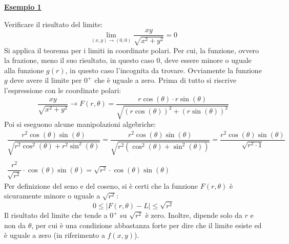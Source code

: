 \documentclass[a4paper]{article}
\newcommand{\example}[1]{\textcolor{Green4}{\textbf{#1}}}
\begin{document}
	\begin{flushleft}
		\example{\underline{Esempio 1}}
	\end{flushleft}
	Verificare il risultato del limite:
	\begin{equation*}
		\displaystyle\lim_{\left(x,y\right) \rightarrow \left(0,0\right)} \dfrac{xy}{\sqrt{x^{2} + y^{2}}} = 0
	\end{equation*}
	Si applica il teorema per i limiti in coordinate polari. Per cui, la funzione, ovvero la frazione, meno il suo risultato, in questo caso $0$, deve essere minore o uguale alla funzione $g\left(r\right)$, in questo caso l'incognita da trovare. Ovviamente la funzione $g$ deve avere il limite per $0^{+}$ che è uguale a zero. Prima di tutto si riscrive l'espressione con le coordinate polari:
	\begin{equation*}
		\dfrac{xy}{\sqrt{x^{2} + y^{2}}} \rightarrow F\left(r, \theta\right) = \dfrac{r\cos\left(\theta\right) \cdot r\sin\left(\theta\right)}{\sqrt{\left(r \cos\left(\theta\right)\right)^{2} + \left(r \sin\left(\theta\right)\right)^{2}}}
	\end{equation*}
	Poi si eseguono alcune manipolazioni algebriche:
	\begin{gather*}
		\dfrac{r^{2} \cos\left(\theta\right)\sin\left(\theta\right)}{\sqrt{r^{2}\cos^{2}\left(\theta\right) + r^{2}\sin^{2}\left(\theta\right)}}
		=
		\dfrac{r^{2} \cos\left(\theta\right)\sin\left(\theta\right)}{\sqrt{r^{2} \left(\cos^{2}\left(\theta\right)+ \sin^{2}\left(\theta\right)\right)}}
		=
		\dfrac{r^{2} \cos\left(\theta\right)\sin\left(\theta\right)}{\sqrt{r^{2} \cdot 1}} \\ \\
		\dfrac{r^{2}}{\sqrt{r^{2}}} \cdot \cos\left(\theta\right)\sin\left(\theta\right) = \sqrt{r^{2}} \cdot \cos\left(\theta\right)\sin\left(\theta\right)
	\end{gather*}
	Per definizione del seno e del coseno, si è certi che la funzione $F\left(r,\theta\right)$ è sicuramente minore o uguale a $\sqrt{r^{2}}$:
	\begin{equation*}
		0 \le \left| F\left(r,\theta\right) - L \right| \le \sqrt{r^{2}}
	\end{equation*}
	Il risultato del limite che tende a $0^{+}$ su $\sqrt{r^{2}}$ è zero. Inoltre, dipende solo da $r$ e non da $\theta$, per cui è una condizione abbastanza forte per dire che il limite esiste ed è uguale a zero (in riferimento a $f\left(x,y\right)$).\newpage
\end{document}

